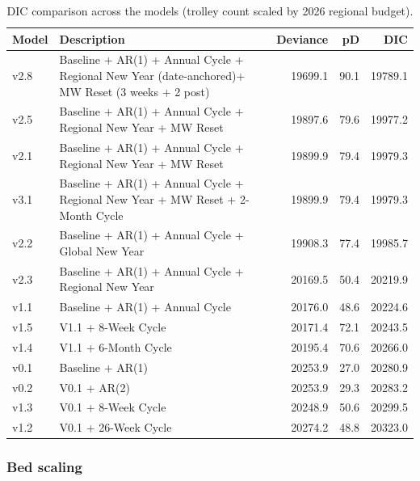 \documentclass[
]{article}
\begin{document}
\begin{table}[!h]
\centering
\caption{\label{tab:spine-dic-budget}DIC comparison across the models (trolley count scaled by 2026 regional budget).}
\centering
\begin{tabular}[t]{llrrr}
\toprule
Model & Description & Deviance & pD & DIC\\
\midrule
v2.8 & Baseline + AR(1) + Annual Cycle + Regional New Year (date-anchored)+ MW Reset (3 weeks + 2 post) & 19699.1 & 90.1 & 19789.1\\
v2.5 & Baseline + AR(1) + Annual Cycle + Regional New Year + MW Reset & 19897.6 & 79.6 & 19977.2\\
v2.1 & Baseline + AR(1) + Annual Cycle + Regional New Year + MW Reset & 19899.9 & 79.4 & 19979.3\\
v3.1 & Baseline + AR(1) + Annual Cycle + Regional New Year + MW Reset + 2-Month Cycle & 19899.9 & 79.4 & 19979.3\\
v2.2 & Baseline + AR(1) + Annual Cycle + Global New Year & 19908.3 & 77.4 & 19985.7\\
\addlinespace
v2.3 & Baseline + AR(1) + Annual Cycle +  Regional New Year & 20169.5 & 50.4 & 20219.9\\
v1.1 & Baseline + AR(1) + Annual Cycle & 20176.0 & 48.6 & 20224.6\\
v1.5 & V1.1 + 8-Week Cycle & 20171.4 & 72.1 & 20243.5\\
v1.4 & V1.1 + 6-Month Cycle & 20195.4 & 70.6 & 20266.0\\
v0.1 & Baseline + AR(1) & 20253.9 & 27.0 & 20280.9\\
\addlinespace
v0.2 & V0.1 + AR(2) & 20253.9 & 29.3 & 20283.2\\
v1.3 & V0.1 + 8-Week Cycle & 20248.9 & 50.6 & 20299.5\\
v1.2 & V0.1 + 26-Week Cycle & 20274.2 & 48.8 & 20323.0\\
\bottomrule
\end{tabular}
\end{table}

\subsubsection{Bed scaling}\label{bed-scaling-1}
\end{document}
